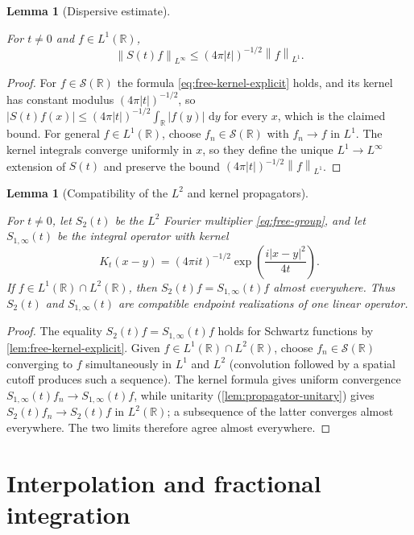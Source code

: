 \documentclass[11pt,oneside]{book}
\providecommand{\uses}[1]{}
\newtheorem{lemma}[theorem]{Lemma}
\theoremstyle{definition}
\theoremstyle{remark}
\newcommand{\R}{\mathbb R}
\newcommand{\Ssch}{\mathcal S}
\newcommand{\1}{\mathbf 1}
\newcommand{\dd}{\,\mathrm d}
\newcommand{\norm}[1]{\left\lVert #1\right\rVert}
\begin{document}
\begin{lemma}[Dispersive estimate]\label{lem:dispersive-1d}
\uses{lem:free-kernel-explicit, def:propagator}
For $t\ne0$ and $f\in L^1(\R)$,
\[
  \norm{S(t)f}_{L^\infty}\le (4\pi|t|)^{-1/2}\norm f_{L^1}.
\]
\end{lemma}

\begin{proof}
\uses{lem:free-kernel-explicit}
For $f\in\Ssch(\R)$ the formula \eqref{eq:free-kernel-explicit} holds, and
its kernel has constant modulus $(4\pi|t|)^{-1/2}$, so
$|S(t)f(x)|\le(4\pi|t|)^{-1/2}\int_\R|f(y)|\,\dd y$ for every $x$, which is
the claimed bound.  For general $f\in L^1(\R)$, choose $f_n\in\Ssch(\R)$ with
$f_n\to f$ in $L^1$.  The kernel integrals converge uniformly in $x$, so
they define the unique $L^1\to L^\infty$ extension of $S(t)$ and preserve the
bound $(4\pi|t|)^{-1/2}\norm f_{L^1}$.
\end{proof}

\begin{lemma}[Compatibility of the $L^2$ and kernel propagators]
\label{lem:propagator-compatibility}
\uses{def:propagator, lem:free-kernel-explicit}
For $t\ne0$, let $S_2(t)$ be the $L^2$ Fourier multiplier
\eqref{eq:free-group}, and let $S_{1,\infty}(t)$ be the integral operator
with kernel
\[
 K_t(x-y)=(4\pi it)^{-1/2}\exp\!\left(\frac{i|x-y|^2}{4t}\right).
\]
If $f\in L^1(\R)\cap L^2(\R)$, then $S_2(t)f=S_{1,\infty}(t)f$ almost
everywhere.  Thus $S_2(t)$ and $S_{1,\infty}(t)$ are compatible endpoint
realizations of one linear operator.
\end{lemma}

\begin{proof}
\uses{lem:free-kernel-explicit, lem:complex-gaussian-kernel, lem:propagator-unitary}
The equality $S_2(t)f=S_{1,\infty}(t)f$ holds for Schwartz functions by
\cref{lem:free-kernel-explicit}.  Given $f\in L^1(\R)\cap L^2(\R)$, choose
$f_n\in\Ssch(\R)$ converging to $f$ simultaneously in $L^1$ and $L^2$
(convolution followed by a spatial cutoff produces such a sequence).  The
kernel formula gives uniform convergence $S_{1,\infty}(t)f_n\to
S_{1,\infty}(t)f$, while unitarity (\cref{lem:propagator-unitary}) gives
$S_2(t)f_n\to S_2(t)f$ in $L^2(\R)$; a subsequence of the latter converges
almost everywhere.  The two limits therefore agree almost everywhere.
\end{proof}


\chapter{Interpolation and fractional integration}\label{chap:frac-int}
\end{document}
